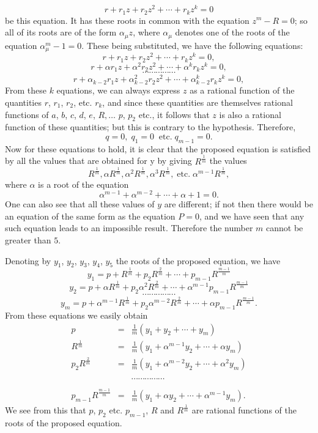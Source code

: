 \documentclass[12pt]{article}
\begin{document}
\[ r + r_1 z + r_2 z^2 + \cdots + r_k z^k = 0 \]
be this equation.  It has these roots in common with the equation $z^m-R= 0$; so all of its roots are of the form $\alpha_\mu z$, where $\alpha_\mu$ denotes one of the roots of the equation $\alpha_\mu^m -1 = 0$.  These being substituted, we have the following equations:
\[ r+ r_1 z + r_2 z^2 + \cdots + r_k z^k = 0,\]
\[ r+ \alpha r_1 z + \alpha^2 r_2 z^2 + \cdots + \alpha^k r_k z^k = 0,\]
\[ \cdots \cdots \cdots \cdots \cdots \]
\[ r+ \alpha_{k-2}r_1 z + \alpha_{k-2}^2r_2 z^2 + \cdots + \alpha_{k-2}^kr_k z^k = 0,\]
From these $k$ equations, we can always express $z$ as a rational function of the quantities $r$, $r_1$, $r_2$, etc. $r_k$, and since these quantities are themselves rational functions of $a$, $b$, $c$, $d$, $e$, $R, \dots$ $p$, $p_2$ etc., it follows that $z$ is also a rational function of these quantities; but this is contrary to the hypothesis.  Therefore,
\[ q = 0, \; q_1 = 0 \; \; \mathrm{etc.} \; q_{m-1} = 0 .\]
Now for these equations to hold, it is clear that the proposed equation is satisfied by all the values that are obtained for y by giving $R^{\frac{1}{m}}$ the values 
\[ R^{\frac{1}{m}}, \alpha R^{\frac{1}{m}},\alpha^2 R^{\frac{1}{m}},\alpha^3 R^{\frac{1}{m}}, \; \mathrm{etc.} \; \alpha^{m-1} R^{\frac{1}{m}} , \]
where $\alpha$ is a root of the equation
\[ \alpha^{m-1} + \alpha^{m-2} + \cdots + \alpha + 1 = 0 .\]
One can also see that all these values of $y$ are different; if not then there would be an equation of the same form as the equation $P=0$, and we have seen that any such equation leads to an impossible result.  Therefore the number $m$ cannot be greater than $5$.  

Denoting by $y_1$, $y_2$, $y_3$, $y_4$, $y_5$ the roots of the proposed equation, we have
\[ y_1 = p + R^{\frac{1}{m}} + p_2 R^{\frac{2}{m}} + \cdots + p_{m-1}R^{\frac{m-1}{m}} \]
\[ y_2 = p + \alpha R^{\frac{1}{m}} + p_2 \alpha^2 R^{\frac{2}{m}} + \cdots + \alpha^{m-1} p_{m-1}R^{\frac{m-1}{m}}\]
\[ \cdots \cdots \cdots \cdots \cdots \]
\[ y_m = p + \alpha^{m-1} R^{\frac{1}{m}} + p_2 \alpha^{m-2} R^{\frac{2}{m}} + \cdots + \alpha p_{m-1}R^{\frac{m-1}{m}} . \]
From these equations we easily obtain
\begin{eqnarray*} p &=& \frac{1}{m}\left(y_1 +y_2 + \cdots + y_m\right) \\
 R^{\frac{1}{m}} &=& \frac{1}{m}\left(y_1 + \alpha^{m-1}y_2 + \cdots + \alpha y_m\right) \\
 p_2R^{\frac{2}{m}} &=& \frac{1}{m} \left( y_1 + \alpha^{m-2} y_2 + \cdots + \alpha^2 y_m \right) \\
  && \\
   &&\cdots \cdots \cdots \cdots \cdots \\ 
   && \\   
   p_{m-1}R^{\frac{m-1}{m}} &=& \frac{1}{m} \left(y_1 + \alpha y_2 + \cdots + \alpha^{m-1} y_m \right).\end{eqnarray*} 
We see from this that $p$, $p_2$ etc. $p_{m-1}$, $R$ and $R^{\frac{1}{m}}$ are rational functions of the roots of the proposed equation. 
\end{document}
